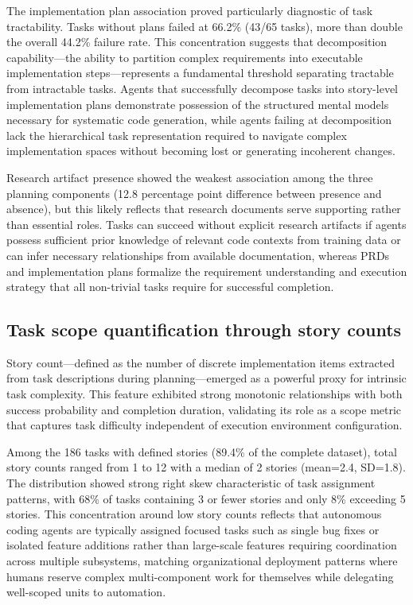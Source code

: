 \documentclass[]{article}
\begin{document}
The implementation plan association proved particularly diagnostic of task tractability. Tasks without plans failed at 66.2\% (43/65 tasks), more than double the overall 44.2\% failure rate. This concentration suggests that decomposition capability—the ability to partition complex requirements into executable implementation steps—represents a fundamental threshold separating tractable from intractable tasks. Agents that successfully decompose tasks into story-level implementation plans demonstrate possession of the structured mental models necessary for systematic code generation, while agents failing at decomposition lack the hierarchical task representation required to navigate complex implementation spaces without becoming lost or generating incoherent changes.

Research artifact presence showed the weakest association among the three planning components (12.8 percentage point difference between presence and absence), but this likely reflects that research documents serve supporting rather than essential roles. Tasks can succeed without explicit research artifacts if agents possess sufficient prior knowledge of relevant code contexts from training data or can infer necessary relationships from available documentation, whereas PRDs and implementation plans formalize the requirement understanding and execution strategy that all non-trivial tasks require for successful completion.

\subsection{Task scope quantification through story counts}

Story count—defined as the number of discrete implementation items extracted from task descriptions during planning—emerged as a powerful proxy for intrinsic task complexity. This feature exhibited strong monotonic relationships with both success probability and completion duration, validating its role as a scope metric that captures task difficulty independent of execution environment configuration.

Among the 186 tasks with defined stories (89.4\% of the complete dataset), total story counts ranged from 1 to 12 with a median of 2 stories (mean=2.4, SD=1.8). The distribution showed strong right skew characteristic of task assignment patterns, with 68\% of tasks containing 3 or fewer stories and only 8\% exceeding 5 stories. This concentration around low story counts reflects that autonomous coding agents are typically assigned focused tasks such as single bug fixes or isolated feature additions rather than large-scale features requiring coordination across multiple subsystems, matching organizational deployment patterns where humans reserve complex multi-component work for themselves while delegating well-scoped units to automation.
\end{document}
